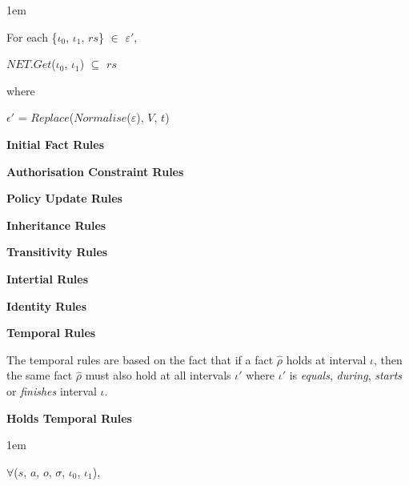 \documentclass[11pt]{report}
\newenvironment{vquote}
{
  \begin{list}{}{\leftmargin 1em}\item[]
}
{
  \end{list}
}
\begin{document}
\begin{itemize}
              \begin{vquote}
                 For each \{${\iota}_0$, ${\iota}_1$, $rs$\} $\in$ $\varepsilon'$,

                 $NET.Get$(${\iota}_0$, ${\iota}_1$) $\subseteq$ $rs$

                 where

                 $\epsilon'$ = 
                 $Replace$($Normalise$($\varepsilon$), $V$, $t$)
              \end{vquote}
            
            \item
              {\bf Initial Fact Rules}

            \item
              {\bf Authorisation Constraint Rules}
            
            \item
              {\bf Policy Update Rules}
            
            \item
              {\bf Inheritance Rules}
            
            \item
              {\bf Transitivity Rules}
            
            \item
              {\bf Intertial Rules}
            
            \item
              {\bf Identity Rules}
            
            \item
              {\bf Temporal Rules}

              The temporal rules are based on the fact that if a fact
              $\hat{\rho}$ holds at interval $\iota$, then the same fact
              $\hat{\rho}$ must also hold at all intervals $\iota'$ where
              $\iota'$ is {\em equals}, {\em during}, {\em starts} or
              {\em finishes} interval $\iota$.

              \begin{itemize}
              
                \item
                  {\bf Holds Temporal Rules}

                  \begin{vquote}
                    $\forall$($s$, $a$, $o$, $\sigma$, $\iota_0$, $\iota_1$),
                  

\end{vquote}
\end{itemize}
\end{itemize}
\end{document}
